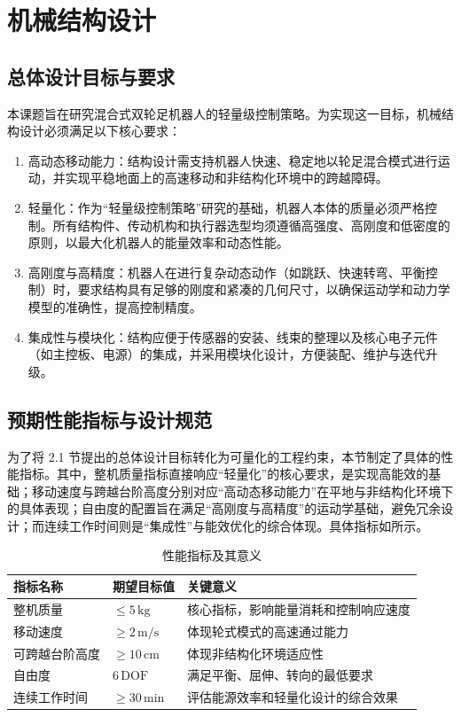 \chapter{机械结构设计}\label{chap:mechanism}

\section{总体设计目标与要求}

本课题旨在研究混合式双轮足机器人的轻量级控制策略。为实现这一目标，机械结构设计必须满足以下核心要求：

\begin{enumerate}
  \item 高动态移动能力：结构设计需支持机器人快速、稳定地以轮足混合模式进行运动，并实现平稳地面上的高速移动和非结构化环境中的跨越障碍。
  \item 轻量化：作为“轻量级控制策略”研究的基础，机器人本体的质量必须严格控制。所有结构件、传动机构和执行器选型均须遵循高强度、高刚度和低密度的原则，以最大化机器人的能量效率和动态性能。
  \item 高刚度与高精度：机器人在进行复杂动态动作（如跳跃、快速转弯、平衡控制）时，要求结构具有足够的刚度和紧凑的几何尺寸，以确保运动学和动力学模型的准确性，提高控制精度。
  \item 集成性与模块化：结构应便于传感器的安装、线束的整理以及核心电子元件（如主控板、电源）的集成，并采用模块化设计，方便装配、维护与迭代升级。
\end{enumerate}

\section{预期性能指标与设计规范}

为了将 2.1 节提出的总体设计目标转化为可量化的工程约束，本节制定了具体的性能指标。其中，整机质量指标直接响应“轻量化”的核心要求，是实现高能效的基础；移动速度与跨越台阶高度分别对应“高动态移动能力”在平地与非结构化环境下的具体表现；自由度的配置旨在满足“高刚度与高精度”的运动学基础，避免冗余设计；而连续工作时间则是“集成性”与能效优化的综合体现。具体指标如所示。

\begin{table}[htbp]
  \centering
  \caption{性能指标及其意义}\label{tab:design-targets}
  \renewcommand{\arraystretch}{1.3}
  \begin{tabular}{p{3cm}p{3cm}p{7cm}}
    \toprule
    指标名称 & 期望目标值 & 关键意义 \\
    \midrule
    整机质量 & $\leq 5\,\mathrm{kg}$ & 核心指标，影响能量消耗和控制响应速度 \\
    移动速度 & $\geq 2\,\mathrm{m/s}$ & 体现轮式模式的高速通过能力 \\
    可跨越台阶高度 & $\geq 10\,\mathrm{cm}$ & 体现非结构化环境适应性 \\
    自由度 & $6\,\mathrm{DOF}$ & 满足平衡、屈伸、转向的最低要求 \\
    连续工作时间 & $\geq 30\,\mathrm{min}$ & 评估能源效率和轻量化设计的综合效果 \\
    \bottomrule
  \end{tabular}
\end{table}

